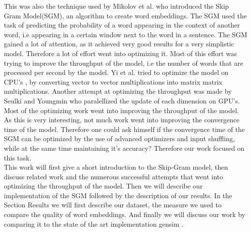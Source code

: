This was also the technique used by Mikolov et al. \cite{mikolov} who  introduced the Skip Gram Model(SGM), an algorithm to create word embeddings. The SGM used the task of predicting the probability of a word appearing in the context of another word, i.e appearing in a certain window next to the word in a sentence. The SGM gained a lot of attention, as it achieved very good results for a very simplistic model. Therefore a lot of effort went into optimizing it. Most of this effort was trying to improve the throughput of the model, i.e the number of words that are processed per second by the model.  Yi et al. tried to optimize the model on CPU's \cite{intel}, by converting vector to vector multiplications into matrix matrix multiplications. Another attempt at optimizing the throughput was made by Seulki and Youngmin \cite{gpu} who paralellized the update of each dimension on GPU's. Most of the optimizing work went into improving the throughput of the model. As this is very interesting, not much work went into improving the convergence time of the model. Therefore one could ask  himself if  the convergence time of the SGM can be optimized by the use of advanced optimizers and input shuffling, while at the same time maintaining it's accuracy?  Therefore our work focused on this task.\\

This work will first give a short introduction to the Skip-Gram model, then discuss related work and the numerous successful attempts that went into optimizing the throughput of the model. Then we will describe our implementation of the SGM followed by the description of our results. In the Section Results we will first describe our dataset, the measure we used to compare the quality of word embeddings. And finally we will discuss our work by comparing it to the state of the art implementation gensim \cite{gensim}. 

  














